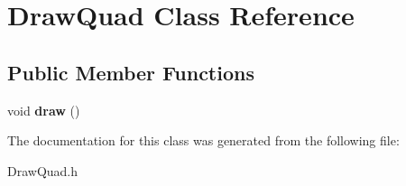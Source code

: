 \hypertarget{class_draw_quad}{}\section{Draw\+Quad Class Reference}
\label{class_draw_quad}
\subsection*{Public Member Functions}
\begin{DoxyCompactItemize}
\item 
\mbox{\label{class_draw_quad_a24c571610de1cf6ab05da5b86db13f7b}} 
void {\bfseries draw} ()
\end{DoxyCompactItemize}


The documentation for this class was generated from the following file\+:\begin{DoxyCompactItemize}
\item 
Draw\+Quad.\+h\end{DoxyCompactItemize}
